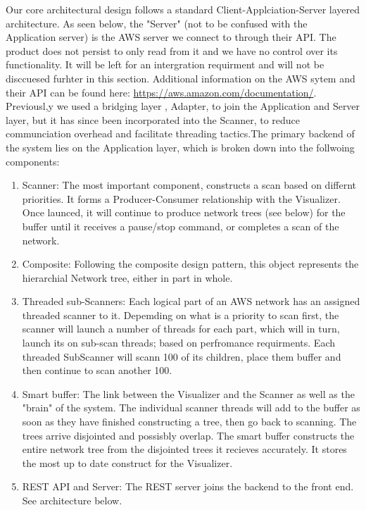 \documentclass[hidelinks,a4paper,12pt]{article}
\begin{document}
Our core architectural design follows a standard Client-Applciation-Server layered architecture. As seen below, the "Server" (not to be confused with the Application server) is the AWS server we connect to through their API. The product does not persist to only read from it and we have no control over its functionality. It will be left for an intergration requirment and will not be disccuesed furhter in this section. Additional information on the AWS sytem and their API can be found here: \url{https://aws.amazon.com/documentation/}. Previousl,y we used a  bridging layer , Adapter, to join the Application and Server layer, but  it has since been incorporated into the Scanner, to reduce communciation overhead and facilitate threading tactics.The primary backend of the system lies on the Application layer, which is broken down into the follwoing components:
\begin{enumerate}  
	\item Scanner: The most important component, constructs a scan based on differnt priorities. It forms a Producer-Consumer relationship with the Visualizer. Once launced, it will continue to produce network trees (see below) for the buffer until it receives a pause/stop command, or completes a scan of the network. 
	\item Composite:  Following the composite design pattern, this object represents the hierarchial Network tree, either in part in whole.  
	\item Threaded sub-Scanners: Each logical part of an AWS network has an assigned threaded scanner to it. Depemding on what is a priority to scan first, the scanner will launch a number of threads for each part, which will in turn, launch its on sub-scan threads; based on perfromance requirments. Each threaded SubScanner will scann 100 of its children, place them buffer and then continue to scan another 100. 
	\item Smart buffer: The link between the Visualizer and the Scanner as well as the "brain" of the system. The individual scanner threads will add to the buffer as soon as they have finished constructing a tree, then go back to scanning. The trees arrive disjointed and possisbly overlap. The smart buffer constructs the entire network tree from the disjointed trees it recieves accurately. It stores the most up to date construct for the Visualizer.
	\item REST API and Server: The REST server joins the backend to the front end. See architecture below.
\end{enumerate}
\end{document}
